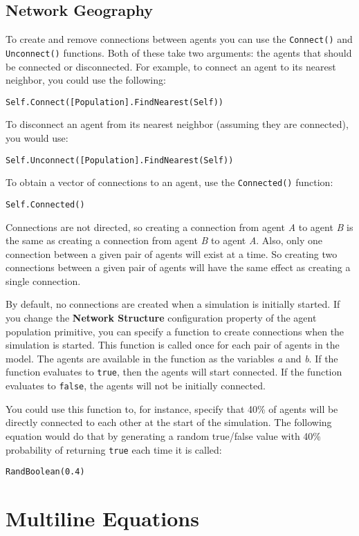 \documentclass[]{memoir}
\renewcommand{\a}[1]{\textbf{#1}}
\begin{document}
\subsection{Network Geography}

To create and remove connections between agents you can use the
\lstinline!Connect()! and \lstinline!Unconnect()! functions. Both of
these take two arguments: the agents that should be connected or
disconnected. For example, to connect an agent to its nearest neighbor,
you could use the following:

\lstinline!Self.Connect([Population].FindNearest(Self))!

To disconnect an agent from its nearest neighbor (assuming they are
connected), you would use:

\lstinline!Self.Unconnect([Population].FindNearest(Self))!

To obtain a vector of connections to an agent, use the
\lstinline!Connected()! function:

\lstinline!Self.Connected()!

Connections are not directed, so creating a connection from agent
\emph{A} to agent \emph{B} is the same as creating a connection from
agent \emph{B} to agent \emph{A}. Also, only one connection between a
given pair of agents will exist at a time. So creating two connections
between a given pair of agents will have the same effect as creating a
single connection.

By default, no connections are created when a simulation is initially
started. If you change the \a{Network Structure} configuration property
of the agent population primitive, you can specify a function to create
connections when the simulation is started. This function is called once
for each pair of agents in the model. The agents are available in the
function as the variables \emph{a} and \emph{b}. If the function
evaluates to \lstinline!true!, then the agents will start connected. If
the function evaluates to \lstinline!false!, the agents will not be
initially connected.

You could use this function to, for instance, specify that 40\% of
agents will be directly connected to each other at the start of the
simulation. The following equation would do that by generating a random
true/false value with 40\% probability of returning \lstinline!true!
each time it is called:

\lstinline!RandBoolean(0.4)!

\section{Multiline Equations}
\end{document}
